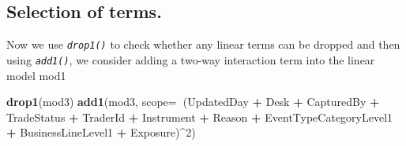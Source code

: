 \documentclass[
]{article}
\newenvironment{Shaded}{\begin{snugshade}}{\end{snugshade}}
\newcommand{\DataTypeTok}[1]{\textcolor[rgb]{0.13,0.29,0.53}{#1}}
\newcommand{\DecValTok}[1]{\textcolor[rgb]{0.00,0.00,0.81}{#1}}
\newcommand{\KeywordTok}[1]{\textcolor[rgb]{0.13,0.29,0.53}{\textbf{#1}}}
\newcommand{\NormalTok}[1]{#1}
\newcommand{\OperatorTok}[1]{\textcolor[rgb]{0.81,0.36,0.00}{\textbf{#1}}}
\newcommand{\OtherTok}[1]{\textcolor[rgb]{0.56,0.35,0.01}{#1}}
\newcommand{\StringTok}[1]{\textcolor[rgb]{0.31,0.60,0.02}{#1}}
\begin{document}
\begin{Shaded}
\end{Shaded}

\normalsize

\subsection{Selection of terms.}
\label{sec:Selection of terms.}

Now we use \emph{\texttt{drop1()}} to check whether any linear terms can
be dropped and then using \emph{\texttt{add1()}}, we consider adding a
two-way interaction term into the linear model mod1

\small

\begin{Shaded}
\begin{Highlighting}[]
\KeywordTok{drop1}\NormalTok{(mod3)}
\KeywordTok{add1}\NormalTok{(mod3, }\DataTypeTok{scope=}\OperatorTok{~}\NormalTok{(UpdatedDay }\OperatorTok{+}\StringTok{ }\NormalTok{Desk }\OperatorTok{+}\StringTok{ }\NormalTok{CapturedBy }\OperatorTok{+}\StringTok{ }\NormalTok{TradeStatus }\OperatorTok{+}\StringTok{ }\NormalTok{TraderId }\OperatorTok{+}
\NormalTok{Instrument }\OperatorTok{+}\StringTok{ }\NormalTok{Reason }\OperatorTok{+}\StringTok{ }\NormalTok{EventTypeCategoryLevel1 }\OperatorTok{+}\StringTok{ }\NormalTok{BusinessLineLevel1 }\OperatorTok{+}\StringTok{ }\NormalTok{Exposure)}\OperatorTok{^}\DecValTok{2}\NormalTok{)}
\end{Highlighting}
\end{Shaded}
\end{document}
